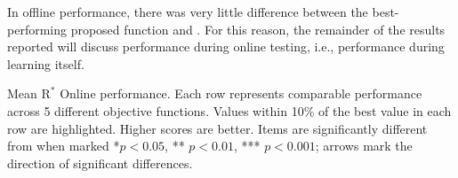 In offline performance, there was very little difference between the best-performing proposed function and \tloA{}. For this reason, the remainder of the results reported will discuss performance during online testing, i.e., performance during learning itself.%


\begin{table}[t]
\footnotesize
  \caption{Mean $\text{R}^*$ Online performance. Each row represents comparable performance across 5 different objective functions. Values within 10\% of the best value in each row are highlighted. Higher scores are better. Items are significantly different from \tloA{} when marked *$p<0.05$, ** $p <0.01$, *** $p<0.001$; arrows mark the direction of significant differences.}
  \label{tab:mean_r_star_performance}
\begin{adjustbox}{width=\columnwidth}

\end{adjustbox}
\end{table}

 


